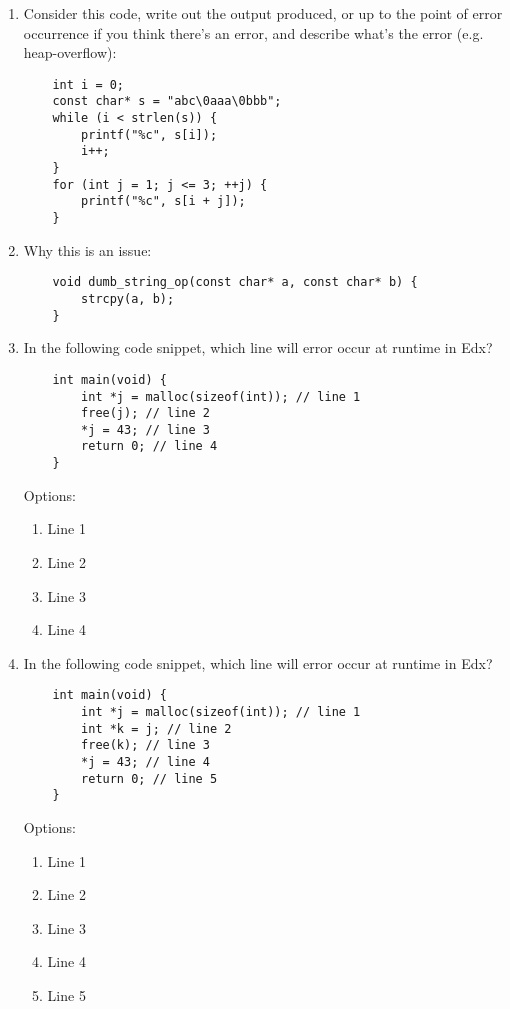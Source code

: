 \documentclass{article}
\begin{document}
\begin{enumerate}
    \newpage
    \item Consider this code, write out the output produced, or up to the point of error occurrence if you think there’s an error, and describe what’s the error (e.g. heap-overflow):
    \begin{lstlisting}
    int i = 0;
    const char* s = "abc\0aaa\0bbb";
    while (i < strlen(s)) {
        printf("%c", s[i]);
        i++;
    }
    for (int j = 1; j <= 3; ++j) {
        printf("%c", s[i + j]);
    }
    \end{lstlisting}
    \vspace{10mm}
    \item Why this is an issue:
    \begin{lstlisting}
    void dumb_string_op(const char* a, const char* b) {
        strcpy(a, b);
    }
    \end{lstlisting}
    \vspace{16mm}
    \item In the following code snippet, which line will error occur at runtime in Edx?
    \begin{lstlisting}
    int main(void) {
        int *j = malloc(sizeof(int)); // line 1
        free(j); // line 2
        *j = 43; // line 3
        return 0; // line 4
    }
    \end{lstlisting}
    Options:
    \begin{enumerate}[label=\alph*.]
        \item Line 1
        \item Line 2
        \item Line 3
        \item Line 4
    \end{enumerate}
    \item In the following code snippet, which line will error occur at runtime in Edx?
    \begin{lstlisting}
    int main(void) {
        int *j = malloc(sizeof(int)); // line 1
        int *k = j; // line 2
        free(k); // line 3
        *j = 43; // line 4
        return 0; // line 5
    }
    \end{lstlisting}
    Options:
    \begin{enumerate}[label=\alph*.]
        \item Line 1
        \item Line 2
        \item Line 3
        \item Line 4
        \item Line 5
    \end{enumerate}

\end{enumerate}
\end{document}

